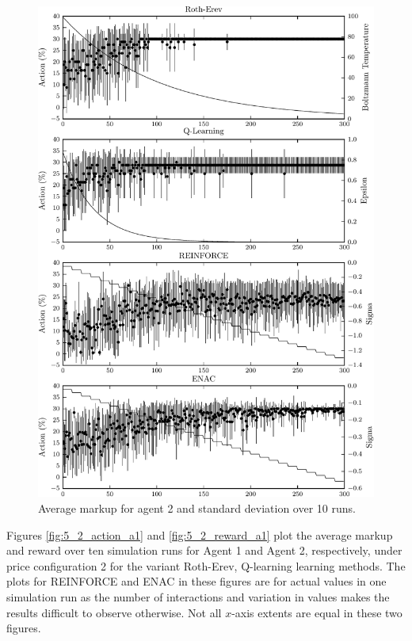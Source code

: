 {	\begin{figure}
	  \centering
	  \includegraphics{figures/fig5_1_action_a2}
	  \caption{Average markup for agent 2 and standard deviation over 10 runs.}
	  \label{fig:5_1_action_a2}
	\end{figure}
}{}

Figures \ref{fig:5_2_action_a1} and \ref{fig:5_2_reward_a1} plot the average
markup and reward over ten simulation runs for Agent 1 and Agent 2,
respectively, under price configuration 2 for the variant Roth-Erev,
Q-learning learning methods.  The plots for REINFORCE and ENAC in these figures
are for actual values in one simulation run as the number of interactions and
variation in values makes the results difficult to observe otherwise.  Not all
$x$-axis extents are equal in these two figures.

